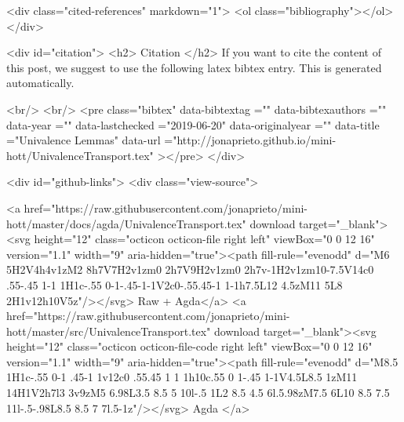   <div class="cited-references" markdown="1">
  <ol class="bibliography"></ol>
  </div>


  
  <div id="citation">
  <h2> Citation </h2>
  If you want to cite the content of this post,
  we suggest to use the following latex bibtex entry.
  This is generated automatically.

  <br/>
  <br/>
  <pre class="bibtex"
       data-bibtextag =""
       data-bibtexauthors =""
       data-year =""
       data-lastchecked ="2019-06-20"
       data-originalyear =""
       data-title ="Univalence Lemmas"
       data-url ="http://jonaprieto.github.io/mini-hott/UnivalenceTransport.tex"
  ></pre>
  </div>
  

  <div id="github-links">
    <div class="view-source">
      
        <a href="https://raw.githubusercontent.com/jonaprieto/mini-hott/master/docs/agda/UnivalenceTransport.tex" download target="_blank"><svg height="12" class="octicon octicon-file right left" viewBox="0 0 12 16" version="1.1" width="9" aria-hidden="true"><path fill-rule="evenodd" d="M6 5H2V4h4v1zM2 8h7V7H2v1zm0 2h7V9H2v1zm0 2h7v-1H2v1zm10-7.5V14c0 .55-.45 1-1 1H1c-.55 0-1-.45-1-1V2c0-.55.45-1 1-1h7.5L12 4.5zM11 5L8 2H1v12h10V5z"/></svg> Raw + Agda</a>
        <a href="https://raw.githubusercontent.com/jonaprieto/mini-hott/master/src/UnivalenceTransport.tex" download target="_blank"><svg height="12" class="octicon octicon-file-code right left" viewBox="0 0 12 16" version="1.1" width="9" aria-hidden="true"><path fill-rule="evenodd" d="M8.5 1H1c-.55 0-1 .45-1 1v12c0 .55.45 1 1 1h10c.55 0 1-.45 1-1V4.5L8.5 1zM11 14H1V2h7l3 3v9zM5 6.98L3.5 8.5 5 10l-.5 1L2 8.5 4.5 6l.5.98zM7.5 6L10 8.5 7.5 11l-.5-.98L8.5 8.5 7 7l.5-1z"/></svg> Agda </a>
      
